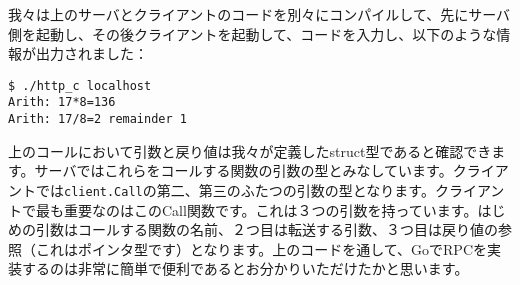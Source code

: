 我々は上のサーバとクライアントのコードを別々にコンパイルして、先にサーバ側を起動し、その後クライアントを起動して、コードを入力し、以下のような情報が出力されました：



\begin{lstlisting}[numbers=none]
$ ./http_c localhost
Arith: 17*8=136
Arith: 17/8=2 remainder 1
\end{lstlisting}

上のコールにおいて引数と戻り値は我々が定義したstruct型であると確認できます。サーバではこれらをコールする関数の引数の型とみなしています。クライアントでは\texttt{client.Call}の第二、第三のふたつの引数の型となります。クライアントで最も重要なのはこのCall関数です。これは３つの引数を持っています。はじめの引数はコールする関数の名前、２つ目は転送する引数、３つ目は戻り値の参照（これはポインタ型です）となります。上のコードを通して、GoでRPCを実装するのは非常に簡単で便利であるとお分かりいただけたかと思います。

